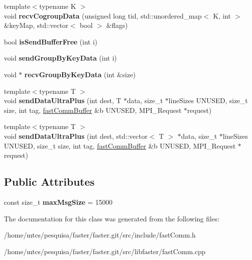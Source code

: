 \begin{DoxyCompactItemize}
\item 
\hypertarget{classfaster_1_1fastComm_ae7cea23c2c6dc47ac9e115685163d0c9}{}\label{classfaster_1_1fastComm_ae7cea23c2c6dc47ac9e115685163d0c9} 
{\footnotesize template$<$typename K $>$ }\\void {\bfseries recv\+Cogroup\+Data} (unsigned long tid, std\+::unordered\+\_\+map$<$ K, int $>$ \&key\+Map, std\+::vector$<$ bool $>$ \&flags)
\item 
\hypertarget{classfaster_1_1fastComm_ac4faadb2677abcae51a0248db2408d6f}{}\label{classfaster_1_1fastComm_ac4faadb2677abcae51a0248db2408d6f} 
bool {\bfseries is\+Send\+Buffer\+Free} (int i)
\item 
\hypertarget{classfaster_1_1fastComm_a1c1f95981846c4ef1b5aca1d44ed6fdf}{}\label{classfaster_1_1fastComm_a1c1f95981846c4ef1b5aca1d44ed6fdf} 
void {\bfseries send\+Group\+By\+Key\+Data} (int i)
\item 
\hypertarget{classfaster_1_1fastComm_a9d67334dcf7d808ab53c7e608f80778f}{}\label{classfaster_1_1fastComm_a9d67334dcf7d808ab53c7e608f80778f} 
void $\ast$ {\bfseries recv\+Group\+By\+Key\+Data} (int \&size)
\item 
\hypertarget{classfaster_1_1fastComm_a5572027981936643d12277c7e47bf54d}{}\label{classfaster_1_1fastComm_a5572027981936643d12277c7e47bf54d} 
{\footnotesize template$<$typename T $>$ }\\void {\bfseries send\+Data\+Ultra\+Plus} (int dest, T $\ast$data, size\+\_\+t $\ast$line\+Sizes U\+N\+U\+S\+ED, size\+\_\+t size, int tag, \hyperlink{classfaster_1_1fastCommBuffer}{fast\+Comm\+Buffer} \&b U\+N\+U\+S\+ED, M\+P\+I\+\_\+\+Request $\ast$request)
\item 
\hypertarget{classfaster_1_1fastComm_a2dce32a93a8a66e22d5e8caf650dd83c}{}\label{classfaster_1_1fastComm_a2dce32a93a8a66e22d5e8caf650dd83c} 
{\footnotesize template$<$typename T $>$ }\\void {\bfseries send\+Data\+Ultra\+Plus} (int dest, std\+::vector$<$ T $>$ $\ast$data, size\+\_\+t $\ast$line\+Sizes U\+N\+U\+S\+ED, size\+\_\+t size, int tag, \hyperlink{classfaster_1_1fastCommBuffer}{fast\+Comm\+Buffer} \&b U\+N\+U\+S\+ED, M\+P\+I\+\_\+\+Request $\ast$request)
\end{DoxyCompactItemize}
\subsection*{Public Attributes}
\begin{DoxyCompactItemize}
\item 
\hypertarget{classfaster_1_1fastComm_a1ed98bac8e9b75ff2706b2a3e3c6469d}{}\label{classfaster_1_1fastComm_a1ed98bac8e9b75ff2706b2a3e3c6469d} 
const size\+\_\+t {\bfseries max\+Msg\+Size} = 15000
\end{DoxyCompactItemize}


The documentation for this class was generated from the following files\+:\begin{DoxyCompactItemize}
\item 
/home/mtcs/pesquisa/faster/faster.\+git/src/include/fast\+Comm.\+h\item 
/home/mtcs/pesquisa/faster/faster.\+git/src/libfaster/fast\+Comm.\+cpp\end{DoxyCompactItemize}
